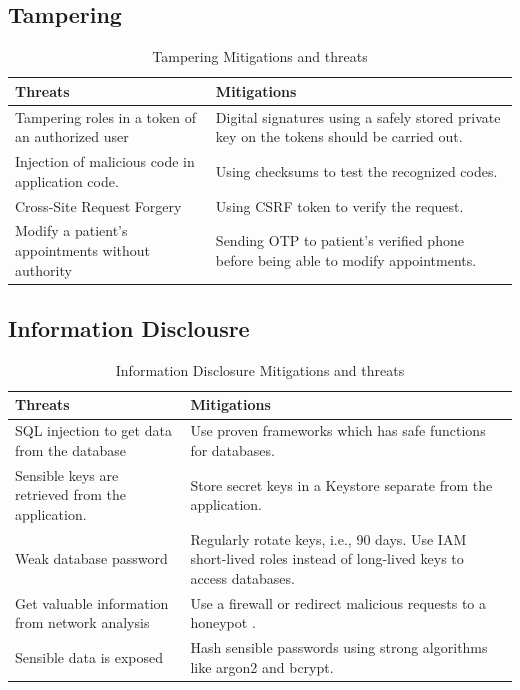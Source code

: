 \subsection{Tampering}

\begingroup
\centering
\setlength{\tabcolsep}{6.5pt} %
\renewcommand{\arraystretch}{1.8} %
\begin{longtable}{ |p{7cm}| p{8cm} |}
\caption{Tampering Mitigations and threats}
    \label{table:tamp}
\hline
\textbf{Threats} & \textbf{Mitigations} \\
\hline
Tampering roles in a token of an authorized user & Digital signatures using a safely stored private key on the tokens should be carried out.\\
\hline
Injection of malicious code in application code. & Using checksums to test the recognized codes.\\
\hline
Cross-Site Request Forgery & Using CSRF token to verify the request.\\
\hline
Modify a patient's appointments without authority & Sending OTP to patient's verified phone before being able to modify appointments.\\
\hline
\end{longtable}
\endgroup



\subsection{Information Disclousre}

\begingroup
\centering
\setlength{\tabcolsep}{6.5pt} %
\renewcommand{\arraystretch}{1.8} %
\begin{longtable}{ |p{7cm}| p{8cm} |}
\caption{Information Disclosure Mitigations and threats}
    \label{table:info_dis}
\hline
\textbf{Threats} & \textbf{Mitigations}\\
\hline
SQL injection to get data from the database & Use proven frameworks which has safe functions for databases.\\
\hline
Sensible keys are retrieved from the application. & Store secret keys in a Keystore separate from the application.\\
\hline
Weak database password &  Regularly rotate keys, i.e., 90 days. \newline
Use IAM short-lived roles instead of long-lived keys to access databases. \\
\hline
Get valuable information from network analysis & Use a firewall or redirect malicious requests to a honeypot \citep{manageengine}.\\
\hline
Sensible data is exposed & Hash sensible passwords using strong algorithms like argon2 and bcrypt. \citep{owasp_secure_encrypt}\\
\hline
\end{longtable}
\endgroup

